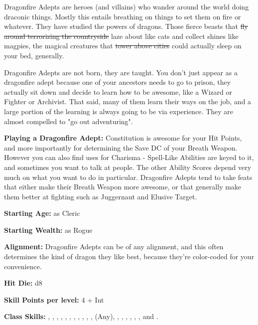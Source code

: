 
Dragonfire Adepts are heroes (and villains) who wander around the world doing draconic things. Mostly this entails breathing on things to set them on fire or whatever. They have studied the powers of dragons. Those fierce beasts that \sout{fly around terrorizing the countryside} laze about like cats and collect shines like magpies, the magical creatures that \sout{tower above cities} could actually sleep on your bed, generally.

Dragonfire Adepts are not born, they are taught. You don't just appear as a dragonfire adept because one of your ancestors needs to go to prison, they actually sit down and decide to learn how to be awesome, like a Wizard or Fighter or Archivist. That said, many of them learn their ways on the job, and a large portion of the learning is always going to be via experience. They are almost compelled to "go out adventuring".

\textbf{Playing a Dragonfire Adept:} Constitution is awesome for your Hit Points, and more importantly for determining the Save DC of your Breath Weapon. However you can also find uses for Charisma - Spell-Like Abilities are keyed to it, and sometimes you want to talk at people. The other Ability Scores depend very much on what you want to do in particular. Dragonfire Adepts tend to take feats that either make their Breath Weapon more awesome, or that generally make them better at fighting such as Juggernaut and Elusive Target.

\textbf{Starting Age:} as Cleric

\textbf{Starting Wealth:} as Rogue

\textbf{Alignment:} Dragonfire Adepts can be of any alignment, and this often determines the kind of dragon they like best, because they're color-coded for your convenience.

\textbf{Hit Die:} d8

\textbf{Skill Points per level:} 4 + Int

\textbf{Class Skills:} , , , , , , , , , , ,  (Any), , , , , , , and .

